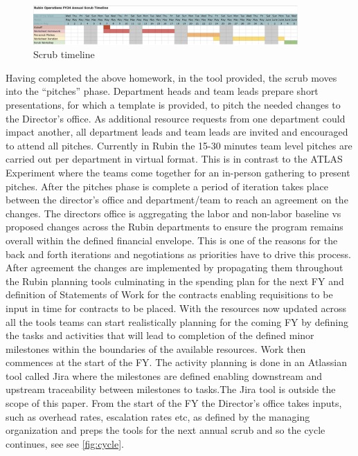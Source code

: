 \begin{figure}
\begin{centering}
\includegraphics[width=0.9\textwidth]{Figure1Scrubtimeline}
	\caption{Scrub timeline
\label{fig:timeline}}
\end{centering}
\end{figure}
Having completed the above homework, in the tool provided, the scrub moves into the “pitches” phase. Department heads and team leads prepare short presentations, for which a template is provided, to pitch the needed changes to the Director’s office. As additional resource requests from one department could impact another, all department leads and team leads are invited and encouraged to attend all pitches. Currently in Rubin the 15-30 minutes team level pitches are carried out per department in virtual format. This is in contrast to the ATLAS Experiment where the teams come together for an in-person gathering to present pitches.
After the pitches phase is complete a period of iteration takes place between the director’s office and department/team to reach an agreement on the changes. 
The directors office is aggregating the labor and non-labor baseline vs proposed changes across the Rubin departments to ensure the program remains overall within the defined financial envelope. This is one of the reasons for the back and forth iterations and negotiations as priorities have to drive this process.
After agreement the changes are implemented by propagating them throughout the Rubin planning tools culminating in the spending plan for the next FY and definition of Statements of Work for the contracts enabling requisitions to be input in time for contracts to be placed. 
With the resources now updated across all the tools teams can start realistically planning for the coming FY by defining the tasks and activities that will lead to completion of the defined minor milestones within the boundaries of the available resources. Work then commences at the start of the FY. The activity planning is done in an Atlassian tool called Jira where the milestones are defined enabling downstream and upstream traceability between milestones to tasks.The Jira tool is outside the scope of this paper.
From the start of the FY the Director’s office takes inputs, such as overhead rates, escalation rates etc, as defined by the managing organization and preps the tools for the next annual scrub and so the cycle continues, see see \autoref{fig:cycle}.

